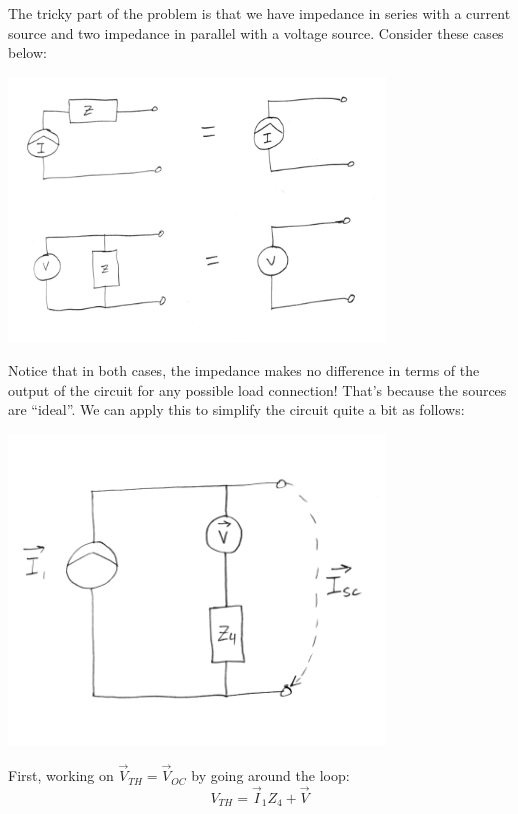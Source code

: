 \begin{ExampleCont}

The tricky part of the problem is that we have impedance in series with a current source
and two impedance in parallel with a voltage source.  Consider these cases below:


\includegraphics[width=100mm]{figsChapt02/SA35824.png}

Notice that in both cases, the impedance makes no difference in terms of
the output of the circuit for any possible load connection!  That's because the sources
are ``ideal''.   We can apply this to simplify the circuit quite a bit as follows:

\includegraphics[width=100mm]{figsChapt02/HL67285.png}


First, working on $\vec V_{TH} = \vec V_{OC}$ by going around the loop:
\[ \boxed{
V_{TH} = \vec I_1Z_4+\vec V
}
\]

\end{ExampleCont}
